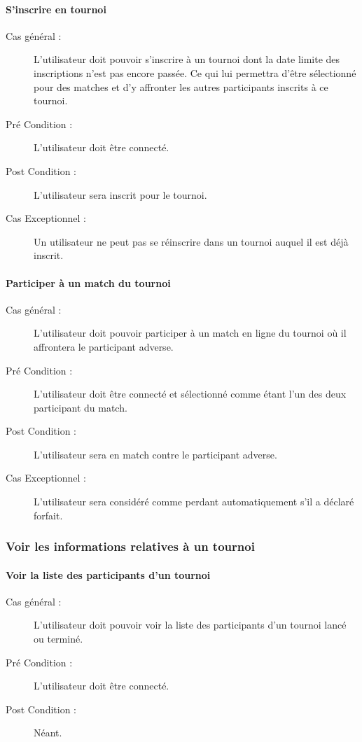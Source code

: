 \documentclass[a4paper]{article}
\begin{document}
\paragraph{S'inscrire en tournoi}
\begin{description}
\item[Cas général :] L'\gls{utilisateur} doit pouvoir s'inscrire à un tournoi dont la date limite des inscriptions n'est pas encore passée.
Ce qui lui permettra d'être sélectionné pour des matches et d'y affronter les autres participants inscrits à ce tournoi.
\item[Pré Condition  :] L'\gls{utilisateur} doit être connecté.
\item[Post Condition :] L'\gls{utilisateur} sera inscrit pour le tournoi.
\item[Cas Exceptionnel :] Un \gls{utilisateur} ne peut pas se réinscrire dans un tournoi auquel il est déjà inscrit.
\end{description} 

\paragraph{Participer à un match du tournoi}
\begin{description}
\item[Cas général :] L'\gls{utilisateur} doit pouvoir participer à un match en ligne du tournoi où il affrontera le participant adverse.
\item[Pré Condition  :] L'\gls{utilisateur} doit être connecté et sélectionné comme étant l'un des deux participant du match.
\item[Post Condition :] L'\gls{utilisateur} sera en match contre le participant adverse.
\item[Cas Exceptionnel :] L'\gls{utilisateur} sera considéré comme perdant automatiquement s'il a déclaré forfait.
\end{description}

\subsubsection{Voir les informations relatives à un tournoi}
\paragraph{Voir la liste des participants d'un tournoi}
\begin{description}
\item[Cas général :] L'\gls{utilisateur} doit pouvoir voir la liste des participants d'un tournoi lancé ou terminé.
\item[Pré Condition  :] L'\gls{utilisateur} doit être connecté.
\item[Post Condition :] Néant.
\end{description}
\end{document}
